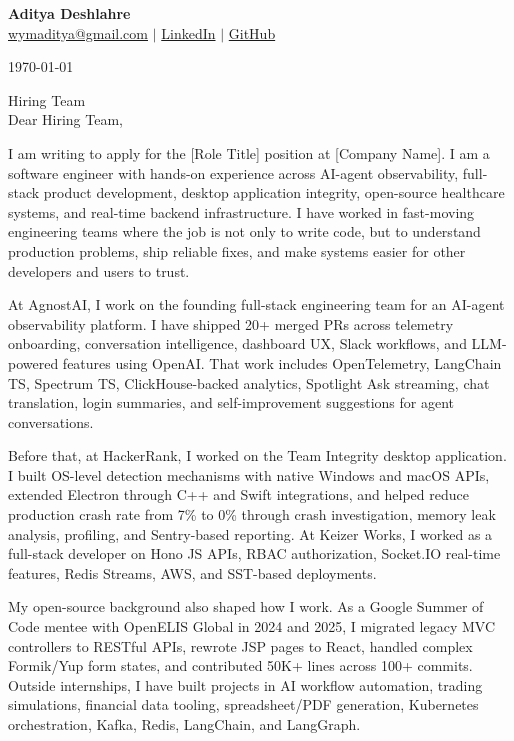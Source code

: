 \documentclass[letterpaper,11pt]{article}
\makeatletter
\newcommand{\candidateName}{Aditya Deshlahre}
\newcommand{\candidateEmail}{wymaditya@gmail.com}
\newcommand{\candidateLinkedIn}{https://www.linkedin.com/in/adityadeshlahre/}
\newcommand{\candidateGithub}{https://github.com/adityadeshlahre}
\newcommand{\companyName}{[Company Name]}
\newcommand{\roleTitle}{[Role Title]}
\makeatother
\begin{document}
\begin{center}
  {\Large \textbf{\candidateName}}\\
  \href{mailto:\candidateEmail}{\candidateEmail} $|$
  \href{\candidateLinkedIn}{LinkedIn} $|$
  \href{\candidateGithub}{GitHub}
\end{center}

\vspace{6pt}

\today

Hiring Team\\
\companyName

Dear Hiring Team,

I am writing to apply for the \roleTitle{} position at \companyName. I am a software engineer with hands-on experience across AI-agent observability, full-stack product development, desktop application integrity, open-source healthcare systems, and real-time backend infrastructure. I have worked in fast-moving engineering teams where the job is not only to write code, but to understand production problems, ship reliable fixes, and make systems easier for other developers and users to trust.

At AgnostAI, I work on the founding full-stack engineering team for an AI-agent observability platform. I have shipped 20+ merged PRs across telemetry onboarding, conversation intelligence, dashboard UX, Slack workflows, and LLM-powered features using OpenAI. That work includes OpenTelemetry, LangChain TS, Spectrum TS, ClickHouse-backed analytics, Spotlight Ask streaming, chat translation, login summaries, and self-improvement suggestions for agent conversations.

Before that, at HackerRank, I worked on the Team Integrity desktop application. I built OS-level detection mechanisms with native Windows and macOS APIs, extended Electron through C++ and Swift integrations, and helped reduce production crash rate from 7\% to 0\% through crash investigation, memory leak analysis, profiling, and Sentry-based reporting. At Keizer Works, I worked as a full-stack developer on Hono JS APIs, RBAC authorization, Socket.IO real-time features, Redis Streams, AWS, and SST-based deployments.

My open-source background also shaped how I work. As a Google Summer of Code mentee with OpenELIS Global in 2024 and 2025, I migrated legacy MVC controllers to RESTful APIs, rewrote JSP pages to React, handled complex Formik/Yup form states, and contributed 50K+ lines across 100+ commits. Outside internships, I have built projects in AI workflow automation, trading simulations, financial data tooling, spreadsheet/PDF generation, Kubernetes orchestration, Kafka, Redis, LangChain, and LangGraph.
\end{document}
